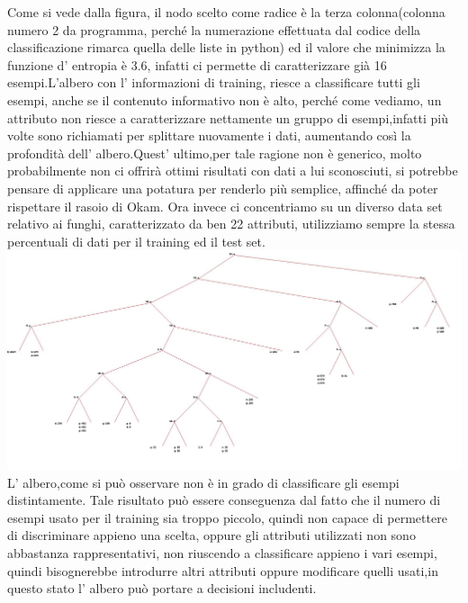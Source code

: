 		 Come si %
		  vede dalla figura, il nodo scelto come radice è la terza colonna(colonna numero 2 da programma, perché la numerazione effettuata dal codice della classificazione rimarca quella delle liste in python) ed il valore che  minimizza la funzione d' entropia è 3.6, infatti ci permette di caratterizzare già 16 esempi.L'albero con l' informazioni di training, riesce a classificare tutti gli esempi, anche se il contenuto informativo non è alto, perché come vediamo, un attributo non riesce a caratterizzare nettamente un gruppo di esempi,infatti più volte sono richiamati per splittare nuovamente i dati, aumentando così la profondità dell' albero.Quest' ultimo,per tale ragione non è generico, molto probabilmente %
		  non ci offrirà ottimi risultati con dati a lui sconosciuti, si potrebbe pensare di applicare una potatura per renderlo più semplice, affinché da poter rispettare il rasoio di Okam.
		\newline
		\newline
		Ora invece ci concentriamo su un diverso data set relativo ai funghi, caratterizzato da ben 22 attributi, utilizziamo sempre la stessa percentuali di dati per il training ed il test set.
		\includegraphics[width=.9\textwidth, height=0.63\textheight]{mushroom.jpg}		
		L' albero,come si può osservare non è in grado di classificare gli esempi distintamente.
	    Tale risultato può essere conseguenza dal fatto che il numero di esempi usato per il training sia troppo piccolo, quindi non capace di permettere di discriminare appieno una scelta, oppure gli attributi utilizzati non sono abbastanza rappresentativi, non riuscendo a classificare appieno i vari esempi, quindi bisognerebbe introdurre altri attributi oppure modificare quelli usati,in questo stato l' albero può portare a decisioni includenti.
